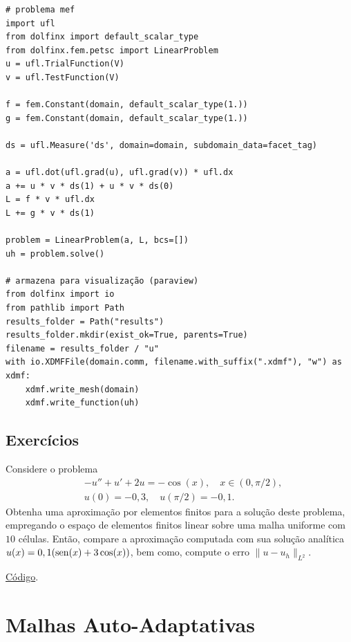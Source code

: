 \begin{ex}
\begin{lstlisting}
# problema mef
import ufl
from dolfinx import default_scalar_type
from dolfinx.fem.petsc import LinearProblem
u = ufl.TrialFunction(V)
v = ufl.TestFunction(V)

f = fem.Constant(domain, default_scalar_type(1.))
g = fem.Constant(domain, default_scalar_type(1.))

ds = ufl.Measure('ds', domain=domain, subdomain_data=facet_tag)

a = ufl.dot(ufl.grad(u), ufl.grad(v)) * ufl.dx
a += u * v * ds(1) + u * v * ds(0)
L = f * v * ufl.dx
L += g * v * ds(1)

problem = LinearProblem(a, L, bcs=[])
uh = problem.solve()

# armazena para visualização (paraview)
from dolfinx import io
from pathlib import Path
results_folder = Path("results")
results_folder.mkdir(exist_ok=True, parents=True)
filename = results_folder / "u"
with io.XDMFFile(domain.comm, filename.with_suffix(".xdmf"), "w") as xdmf:
    xdmf.write_mesh(domain)
    xdmf.write_function(uh)  
\end{lstlisting}

\end{ex}

\subsection{Exercícios}
\badgeRevisar

\begin{exer}\label{exer:dcr}
  Considere o problema
  \begin{align}
    &-u'' + u' + 2u = -\cos(x),\quad x\in (0, \pi/2),\\
    &u(0)=-0,3,\quad u(\pi/2)=-0,1.
  \end{align}
  Obtenha uma aproximação por elementos finitos para a solução deste problema, empregando o espaço de elementos finitos linear sobre uma malha uniforme com $10$ células. Então, compare a aproximação computada com sua solução analítica $u(x) = 0,1(\operatorname{sen}(x)+3\cos(x))$, bem como, compute o erro $\|u-u_h\|_{L^2}$.
\end{exer}
\begin{resp}
  \ifispython
  \href{https://github.com/phkonzen/notas/blob/master/src/MetodoElementosFinitos/cap_mef1d/dados/exer_dcr/exer_dcr.py}{Código}.
  \fi
\end{resp}

\section{Malhas Auto-Adaptativas}\label{cap_mef1d_sec_adapt}
\badgeRevisar

